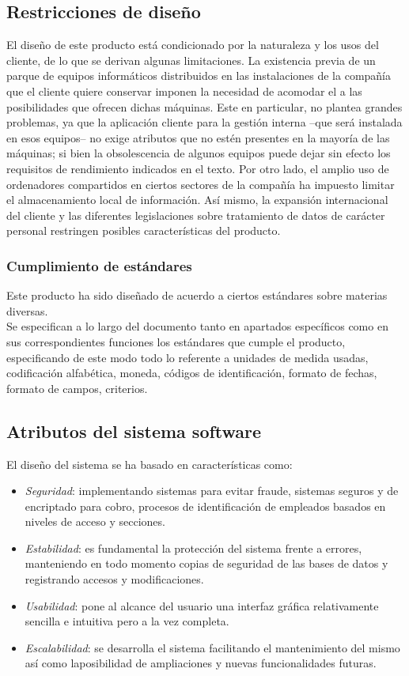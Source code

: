 \documentclass[11pt, a4paper, twoside, titlepage]{article}
\begin{document}
		\subsection{Restricciones de diseño}
			El diseño de este producto está condicionado por la naturaleza y los usos del cliente, de lo que se derivan algunas limitaciones. La existencia previa de un parque de equipos informáticos distribuidos en las instalaciones de la compañía que el cliente quiere conservar imponen la necesidad de acomodar el \software a las posibilidades que ofrecen dichas máquinas. Este en particular, no plantea grandes problemas, ya que la aplicación cliente para la gestión interna --que será instalada en esos equipos-- no exige atributos que no estén presentes en la mayoría de las máquinas; si bien la obsolescencia de algunos equipos puede dejar sin efecto los requisitos de rendimiento indicados en el texto. Por otro lado, el amplio uso de ordenadores compartidos en ciertos sectores de la compañía ha impuesto limitar el almacenamiento local de información. Así mismo, la expansión internacional del cliente y las diferentes legislaciones sobre tratamiento de datos de carácter personal restringen posibles características del producto.
			\subsubsection{Cumplimiento de estándares} %
				Este producto ha sido diseñado de acuerdo a ciertos estándares sobre materias diversas.\\
				
				Se especifican a lo largo del documento tanto en apartados específicos como en sus correspondientes funciones los estándares que cumple el producto, especificando de este modo todo lo referente a unidades de medida usadas, codificación alfabética, moneda, códigos de identificación, formato de fechas, formato de campos, criterios.

		\subsection{Atributos del sistema software}
			El diseño del sistema se ha basado en características como:
			\begin{itemize}
				\item \textit{Seguridad}: implementando sistemas para evitar fraude, sistemas seguros y de encriptado para cobro, procesos de identificación de empleados basados en niveles de acceso y secciones.
				\item \textit{Estabilidad}: es fundamental la protección del sistema frente a errores, manteniendo en todo momento copias de seguridad de las bases de datos y registrando accesos y modificaciones.
				\item \textit{\gls{Usabilidad}}: pone al alcance del usuario una interfaz gráfica relativamente sencilla e intuitiva pero a la vez completa.
				\item \textit{Escalabilidad}: se desarrolla el sistema facilitando el mantenimiento del mismo así como la\break posibilidad de ampliaciones y nuevas funcionalidades futuras.
			\end{itemize}
	
\end{document}
